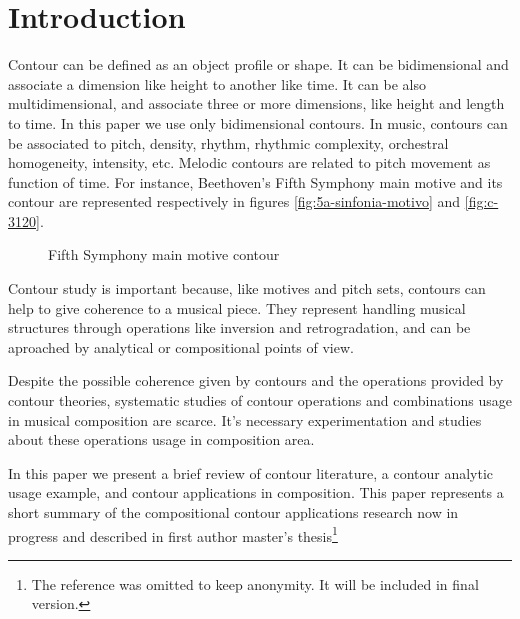 

\section{Introduction}
\label{sec:introduction}

Contour can be defined as an object profile or shape. It can be
bidimensional and associate a dimension like height to another like
time. It can be also multidimensional, and associate three or more
dimensions, like height and length to time. In this paper we use only
bidimensional contours. In music, contours can be associated to pitch,
density, rhythm, rhythmic complexity, orchestral homogeneity,
intensity, etc. Melodic contours are related to pitch movement as
function of time. For instance, Beethoven's Fifth Symphony main motive
and its contour are represented respectively in figures
\ref{fig:5a-sinfonia-motivo} and \ref{fig:c-3120}.

\begin{figure}[!p]
  \centering
  \subfloat[Contour (3 1 2 0)]{
    \texttt{[image: c-3120]}
    \label{fig:c-3120}
  }
  \caption{Fifth Symphony main motive contour}
  \label{fig:5a-sinfonia}
\end{figure}

Contour study is important because, like motives and pitch sets,
contours can help to give coherence to a musical piece. They represent
handling musical structures through operations like inversion and
retrogradation, and can be aproached by analytical or compositional
points of view.

Despite the possible coherence given by contours and the operations
provided by contour theories, systematic studies of contour operations
and combinations usage in musical composition are scarce. It's
necessary experimentation and studies about these operations usage in
composition area.

In this paper we present a brief review of contour literature, a
contour analytic usage example, and contour applications in
composition. This paper represents a short summary of the
compositional contour applications research now in progress and
described in first author master's thesis\footnote{The reference was
  omitted to keep anonymity. It will be included in final version.}

